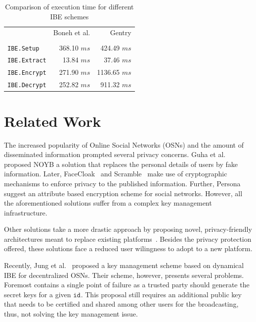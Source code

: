 \documentclass{llncs}
\newcommand{\ms}{\ensuremath{ms}}
\newcommand{\id}[1]{\ensuremath{\mathtt{id}_{#1}}}
\begin{document}
\begin{table}
\begin{center}
\begin{tabular}{ | l | r | r |}
    \cline{2-3}
   \multicolumn{1}{c|}{}& Boneh et al. & Gentry \\ 
   \cline{2-3} 
        \multicolumn{3}{c}{\vspace{-3mm}} \\ \hline 
  \texttt{IBE.Setup} & 368.10 \ms &  424.49 \ms \\
  \texttt{IBE.Extract} & 13.84 \ms & 37.46 \ms \\
  \texttt{IBE.Encrypt} & 271.90 \ms & 1136.65 \ms \\
  \texttt{IBE.Decrypt} & 252.82 \ms & 911.32 \ms\\ \hline 
\end{tabular}
\end{center}
\caption{Comparison of execution time for different IBE schemes}
\label{table:exec_times}
\end{table}



\section{Related Work}\label{sec:relwork}
The increased popularity of Online Social Networks (OSNs) and the amount of disseminated information prompted several privacy concerns. 
Guha et al.~\cite{Guha:2008} proposed NOYB a solution that replaces the personal details of users by fake information. Later, FaceCloak~\cite{Luo:2009} and Scramble~\cite{BeatoScramble} make use of cryptographic mechanisms to enforce privacy to the published information. Further, Persona suggest an attribute based encryption scheme for social networks. However, all the aforementioned solutions suffer from a complex key management infrastructure. 


Other solutions take a more drastic approach by proposing novel, privacy-friendly architectures meant to replace existing platforms~\cite{DBLP:conf/sp/CristofaroSTW12,NYT2010.Diaspora,DBLP:conf/wowmom/CutilloMO11}. Besides the privacy protection offered, these solutions face a reduced user wilingness to adopt to a new platform.

Recently, Jung et al.~\cite{jung} proposed a key management scheme based on dynamical IBE for decentralized OSNs. Their scheme, however, presents several problems. Foremost contains a single point of failure as a trusted party should generate the secret keys for a given \id{}. This proposal still requires an additional public key that needs to be certified and shared among other users for the broadcasting, thus, not solving the key management issue.
\end{document}
